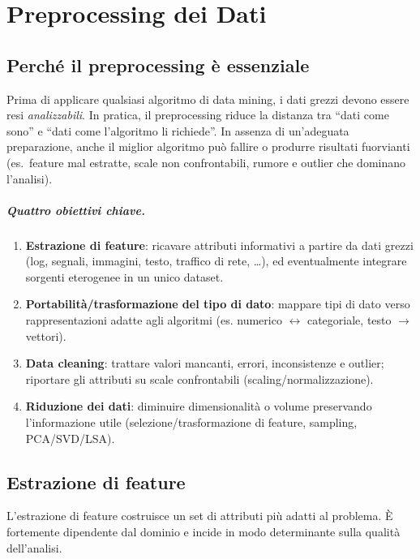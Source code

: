 \chapter{Preprocessing dei Dati}\label{ch:preprocessing}

\section{Perché il preprocessing è essenziale}\label{sec:intro-preproc}
Prima di applicare qualsiasi algoritmo di data mining, i dati grezzi devono essere resi \emph{analizzabili}. In pratica, il preprocessing riduce la distanza tra ``dati come sono'' e ``dati come l'algoritmo li richiede''. In assenza di un'adeguata preparazione, anche il miglior algoritmo può fallire o produrre risultati fuorvianti (es.\ feature mal estratte, scale non confrontabili, rumore e outlier che dominano l'analisi).

\paragraph{Quattro obiettivi chiave.}
\begin{enumerate}
  \item \textbf{Estrazione di feature}: ricavare attributi informativi a partire da dati grezzi (log, segnali, immagini, testo, traffico di rete, \ldots), ed eventualmente integrare sorgenti eterogenee in un unico dataset.
  \item \textbf{Portabilità/trasformazione del tipo di dato}: mappare tipi di dato verso rappresentazioni adatte agli algoritmi (es. numerico $\leftrightarrow$ categoriale, testo $\to$ vettori).
  \item \textbf{Data cleaning}: trattare valori mancanti, errori, inconsistenze e outlier; riportare gli attributi su scale confrontabili (scaling/normalizzazione).
  \item \textbf{Riduzione dei dati}: diminuire dimensionalità o volume preservando l'informazione utile (selezione/trasformazione di feature, sampling, PCA/SVD/LSA).
\end{enumerate}

\section{Estrazione di feature}\label{sec:feature}
L'estrazione di feature costruisce un set di attributi più adatti al problema. È fortemente dipendente dal dominio e incide in modo determinante sulla qualità dell'analisi.

